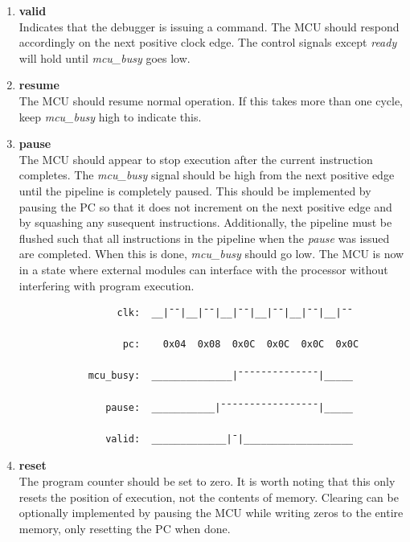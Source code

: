 \documentclass[10pt,a4paper]{article}
\begin{document}
\begin{enumerate}

    \item\textbf{valid}\\
    Indicates that the debugger is issuing a command. The MCU should respond accordingly on the next positive clock edge.
    The control signals except \emph{ready} will hold until \emph{mcu\_busy} goes low.

    \item\textbf{resume}\\
    The MCU should resume normal operation. If this takes more than one cycle, keep \emph{mcu\_busy
    }high to indicate this.

    \item\textbf{pause}\\
    The MCU should appear to stop execution after the current instruction completes. The
    \emph{mcu\_busy} signal should be high from the next positive edge until the pipeline is
    completely paused. This should be implemented by pausing the PC so that it does not increment
    on the next positive edge and by squashing any susequent instructions. Additionally, the pipeline
    must be flushed such that all instructions in the pipeline when the \emph{pause} was
    issued are completed. When this is done, \emph{mcu\_busy} should go low. The MCU is now in a
    state where external modules can interface with the processor without interfering with
    program execution.

        \begin{verbatim}
                 clk:  __|¯¯|__|¯¯|__|¯¯|__|¯¯|__|¯¯|__|¯¯

                  pc:    0x04  0x08  0x0C  0x0C  0x0C  0x0C

            mcu_busy:  ______________|¯¯¯¯¯¯¯¯¯¯¯¯¯¯|_____

               pause:  ___________|¯¯¯¯¯¯¯¯¯¯¯¯¯¯¯¯¯|_____

               valid:  _____________|¯|___________________
        \end{verbatim}

    \item\textbf{reset}\\
    The program counter should be set to zero. It is worth noting that this only resets the position of
    execution, not the contents of memory. Clearing can be optionally implemented by
    pausing the MCU while writing zeros to the entire memory, only resetting the PC when done.


\end{enumerate}
\end{document}
